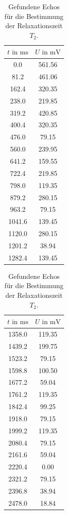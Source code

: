 \begin{table}
  \centering
  \caption{Gefundene Echos für die Bestimmung der Relaxationszeit $T_{2}$.}
  \label{tab:t2_fitwerte}
  \begin{tabular}{c c|}
  \toprule
  $t \text{ in } \si{\milli\second}$ & $U \text{ in } \si{\milli\volt}$\\
  \midrule
  0.0	&	561.56   \\
  81.2	&	461.06   \\
  162.4	&	320.35   \\
  238.0	&	219.85   \\
  319.2	&	420.85   \\
  400.4	&	320.35   \\
  476.0	&	79.15   \\
  560.0	&	239.95   \\
  641.2	&	159.55   \\
  722.4	&	219.85   \\
  798.0	&	119.35   \\
  879.2	&	280.15   \\
  963.2	&	79.15   \\
  1041.6	&	139.45   \\
  1120.0	&	280.15   \\
  1201.2	&	38.94   \\
  1282.4	&	139.45   \\
  \bottomrule
\end{tabular}
\begin{tabular}{|c c|}
\toprule
$t \text{ in } \si{\milli\second}$ & $U \text{ in } \si{\milli\volt}$\\
\midrule
  1358.0	&	119.35   \\
  1439.2	&	199.75   \\
  1523.2	&	79.15   \\
  1598.8	&	100.50   \\
  1677.2	&	59.04   \\
  1761.2	&	119.35   \\
  1842.4	&	99.25   \\
  1918.0	&	79.15   \\
  1999.2	&	119.35   \\
  2080.4	&	79.15   \\
  2161.6	&	59.04   \\
  2220.4	&	0.00   \\
  2321.2	&	79.15   \\
  2396.8	&	38.94   \\
  2478.0	&	18.84   \\

\end{tabular}
\end{table}
